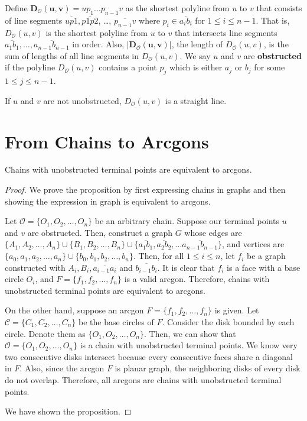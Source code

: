\begin{definition}
Define $\boldsymbol{D_{\mathcal{O}}(u, v)}=up_1\dots p_{n-1}v$  as the shortest polyline from $u$ to $v$ that consists of line segments $\overline{up1}, \overline{p1p2}$, \dots, $\overline{p_{n-1}v}$ where $p_i\in\overline{a_ib_i}$ for $1\le i\le n-1$. That is, $D_{\mathcal{O}}(u, v)$
is the shortest polyline from $u$ to $v$ that intersects line segments $\overline{a_1b_1},\dots,\overline{a_{n-1}b_{n-1}}$ in order. Also, $\boldsymbol{|D_{\mathcal{O}}(u, v)|}$, the length of $D_{\mathcal{O}}(u, v)$, is the sum of lengths of all line segments in $D_{\mathcal{O}}(u, v)$.  
We say $u$ and $v$ are \textbf{obstructed} if the polyline $D_{\mathcal{O}}(u, v)$ contains a point $p_j$ which is either $a_j$ or $b_j$ for some $1\le j\le n-1$.
\end{definition}


\begin{proposition}
If $u$ and $v$ are not unobstructed, $ D_{\mathcal{O}}(u, v)$ is a straight line. 
\end{proposition}

\section{From Chains to Arcgons}
\begin{proposition}
Chains with unobstructed terminal points are equivalent to arcgons. 
\end{proposition}

\begin{proof}
We prove  the proposition by first expressing chains in graphs and then showing the expression in graph is equivalent to arcgons.

Let $\mathcal{O} = \{O_1, O_2, \dots, O_n\}$ be an  arbitrary chain. Suppose our terminal points $u$ and  $v$ are obstructed. Then, construct a graph $G$ whose edges are $\{A_1, A_2, \dots, A_n\}\cup \{B_1, B_2, \dots, B_n\} \cup \{\overline{a_1b_1},\overline{a_2b_2}, \dots \overline{a_{n-1}b_{n-1}} \}$, and vertices are $\{a_0, a_1, a_2, \dots, a_n\}\cup \{b_0, b_1, b_2, \dots, b_n\}$. Then, for all $1\le i\le n$, let $f_i$ be a graph constructed with $A_i, B_i, \overline{a_{i-1}a_i}$ and $\overline{b_{i-1}b_i}$. It is clear that $f_i$ is a face with a base circle $O_i$, and $F=\{f_1, f_2, \dots, f_n\}$ is a valid arcgon. Therefore, chains with unobstructed terminal points are equivalent to arcgons. 

On the other hand, suppose an arcgon $F=\{f_1, f_2, \dots, f_n\}$ is given. Let $\mathcal{C} = \{C_1, C_2, \dots, C_n\}$ be the base circles of $F$. Consider the disk bounded by each circle. Denote them as $\{O_1, O_2, \dots, O_n\}.$ Then, we can show that $\mathcal{O} = \{O_1, O_2, \dots, O_n\}$ is a chain with unobstructed terminal points. We know very two consecutive disks intersect because every consecutive faces share a diagonal in $F$. Also, since the arcgon $F$ is planar graph, the neighboring disks of every disk do not overlap. Therefore, all arcgons are chains with unobstructed terminal points.

We have shown the proposition.
\end{proof}


